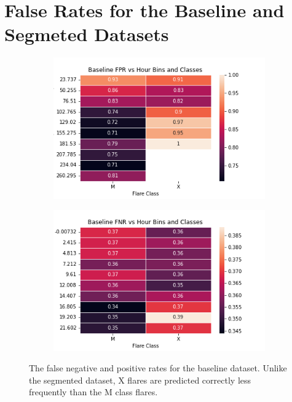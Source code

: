 
\chapter{False Rates for the Baseline and Segmeted Datasets}
\label{appendix:fprfnrother}

\begin{figure}[h]
\centering
\begin{subfigure}[b]{.45\textwidth}
    \includegraphics[width=\linewidth]{ThesisFilePkg/figures/findings/baselineFPR.png}
\end{subfigure}
\begin{subfigure}[b]{.45\textwidth}
    \includegraphics[width=\linewidth]{ThesisFilePkg/figures/findings/baselineFNR.png}
\end{subfigure}
\label{fig:basfr}
\caption{The false negative and positive rates for the baseline dataset. Unlike the segmented dataset, X flares are predicted correctly less frequently than the M class flares.}
\end{figure}


